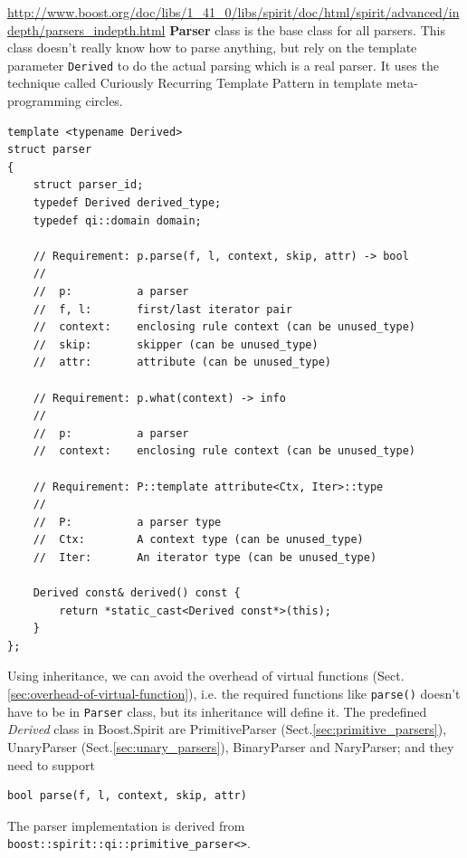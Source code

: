 \url{http://www.boost.org/doc/libs/1_41_0/libs/spirit/doc/html/spirit/advanced/indepth/parsers_indepth.html}
{\bf Parser} class is the base class for all parsers. This class doesn't really
know how to parse anything, but rely on the template parameter \verb!Derived! to
do the actual parsing which is a real parser. It uses the technique called
{Curiously Recurring Template Pattern} in template meta-programming circles.
\begin{lstlisting}
template <typename Derived>
struct parser
{
    struct parser_id;
    typedef Derived derived_type;
    typedef qi::domain domain;

    // Requirement: p.parse(f, l, context, skip, attr) -> bool
    //
    //  p:          a parser
    //  f, l:       first/last iterator pair
    //  context:    enclosing rule context (can be unused_type)
    //  skip:       skipper (can be unused_type)
    //  attr:       attribute (can be unused_type)

    // Requirement: p.what(context) -> info
    //
    //  p:          a parser
    //  context:    enclosing rule context (can be unused_type)

    // Requirement: P::template attribute<Ctx, Iter>::type
    //
    //  P:          a parser type
    //  Ctx:        A context type (can be unused_type)
    //  Iter:       An iterator type (can be unused_type)
    
    Derived const& derived() const {
        return *static_cast<Derived const*>(this);
    }
};
\end{lstlisting}

Using inheritance, we can avoid the overhead of virtual functions
(Sect.\ref{sec:overhead-of-virtual-function}), i.e. the required functions like
\verb!parse()! doesn't have to be in \verb!Parser! class, but its inheritance
will define it. The predefined {\it Derived} class in Boost.Spirit are
PrimitiveParser (Sect.\ref{sec:primitive_parsers}), UnaryParser
(Sect.\ref{sec:unary_parsers}), BinaryParser and NaryParser; and they need to
support
\begin{lstlisting}
bool parse(f, l, context, skip, attr)
\end{lstlisting}
The parser implementation is derived from \verb!boost::spirit::qi::primitive_parser<>!.

